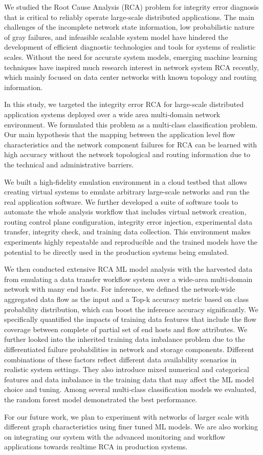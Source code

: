 We studied the Root Cause Analysis (RCA) problem for integrity error diagnosis that is critical to reliably operate large-scale distributed applications. The main challenges of the incomplete network state information, low probabilistic nature of gray failures, and infeasible scalable system model have hindered the development of efficient diagnostic technologies and tools for systems of realistic scales. Without the need for accurate system models, emerging machine learning techniques have inspired much research interest in network system RCA recently, which mainly focused on data center networks with known topology and routing information.

In this study, we targeted the integrity error RCA for large-scale distributed application systems deployed over a wide area multi-domain network environment. We formulated this problem as a multi-class classification problem. Our main hypothesis that the mapping between the application level flow characteristics and the network component failures for RCA can be learned with high accuracy without the network topological and routing information due to the technical and administrative barriers. 

We built a high-fidelity emulation environment in a cloud testbed that allows creating virtual systems to emulate arbitrary large-scale networks and run the real application software. We further developed a suite of software tools to automate the whole analysis workflow that includes virtual network creation, routing control plane configuration, integrity error injection, experimental data transfer, integrity check, and training data collection. This environment makes experiments highly repeatable and reproducible and the trained models have the potential to be directly used in the production systems being emulated.

We then conducted extensive RCA ML model analysis with the harvested data from emulating a data transfer workflow system over a wide-area multi-domain network with many end hosts. For inference, we defined the network-wide aggregated data flow as the input and a Top-k accuracy metric based on class probability distribution, which can boost the inference accuracy significantly. We specifically quantified the impacts of training data features that include the flow coverage between complete of partial set of end hosts and flow attributes. We further looked into the inherited training data imbalance problem due to the differentiated failure probabilities in network and storage components. Different combinations of these factors reflect different data availability scenarios in realistic system settings. They also introduce mixed numerical and categorical features and data imbalance in the training data that may affect the ML model choice and tuning.  Among several multi-class classification models we evaluated, the random forest model demonstrated the best performance.

For our future work, we plan to experiment with networks of larger scale with different graph characteristics using finer tuned ML models. We are also working on integrating our system with the advanced monitoring and workflow applications towards realtime RCA in production systems.


